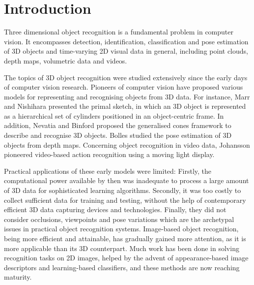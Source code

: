 \chapter{Introduction}
\label{chap/intro} 

Three dimensional object recognition is a fundamental problem in computer vision. It encompasses detection, identification, classification and pose estimation of 3D objects and time-varying 2D visual data in general, including point clouds, depth maps, volumetric data and videos. 

The topics of 3D object recognition were studied extensively since the early days of computer vision research. 
Pioneers of computer vision have proposed various models for representing and recognising objects from 3D data.
For instance, Marr and Nishihara \cite{Marr1978} presented the primal sketch, in which an 3D object is represented as a hierarchical set of cylinders positioned in an object-centric frame. 
In addition, Nevatia and Binford \cite{Nevatia1977} proposed the generalised cones framework to describe and recognise 3D objects. Bolles \etal \cite{Bolles1983} studied the pose estimation of 3D objects from depth maps.
Concerning object recognition in video data, Johansson \cite{Johansson1973} pioneered video-based action recognition using a moving light display. 

Practical applications of these early models were limited: Firstly, the computational power available by then was inadequate to process a large amount of 3D data for sophisticated learning algorithms. Secondly, it was too costly to collect sufficient data for training and testing, without the help of contemporary efficient 3D data capturing devices and technologies. Finally, they did not consider occlusions, viewpoints and pose variations which are the archetypal issues in practical object recognition systems. 
Image-based object recognition, being more efficient and attainable, has gradually gained more attention, as it is more applicable than its 3D counterpart. Much work has been done in solving recognition tasks on 2D images, helped by the advent of appearance-based image descriptors and learning-based classifiers, and these methods are now reaching maturity. 

